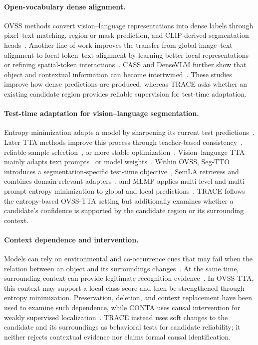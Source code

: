 \documentclass[letterpaper]{article}
\begin{document}
	\paragraph{Open-vocabulary dense alignment.}
	OVSS methods convert vision--language representations into dense labels through pixel--text matching, region or mask prediction, and CLIP-derived segmentation heads~\cite{ghiasi2022openseg,xu2022simple,zegformer2022,liang2023ovseg,ding2023maskclip,cho2024catseg}. Another line of work improves the transfer from global image--text alignment to local token--text alignment by learning better local representations or refining spatial-token interactions~\cite{mukhoti2023pacl,wu2024clipself,hajimiri2025naclip,shao2024cliptrase}. CASS and DenseVLM further show that object and contextual information can become intertwined~\cite{kim2025cass,li2025densevlm}. These studies improve how dense predictions are produced, whereas TRACE asks whether an existing candidate region provides reliable supervision for test-time adaptation.
	
	\paragraph{Test-time adaptation for vision--language segmentation.}
	Entropy minimization adapts a model by sharpening its current test predictions~\cite{grandvalet2004entropy,wang2021tent}. Later TTA methods improve this process through teacher-based consistency~\cite{wang2022cotta}, reliable sample selection~\cite{niu2022eata}, or more stable optimization~\cite{niu2023sar}. Vision--language TTA mainly adapts text prompts~\cite{shu2022tpt} or model weights~\cite{osowiechi2024watt}. Within OVSS, Seg-TTO introduces a segmentation-specific test-time objective~\cite{desilva2025segtto}, SemLA retrieves and combines domain-relevant adapters~\cite{qorbani2025semla}, and MLMP applies multi-level and multi-prompt entropy minimization to global and local predictions~\cite{noori2025mlmp}. TRACE follows the entropy-based OVSS-TTA setting but additionally examines whether a candidate's confidence is supported by the candidate region or its surrounding context.
	
	\paragraph{Context dependence and intervention.}
	Models can rely on environmental and co-occurrence cues that may fail when the relation between an object and its surroundings changes~\cite{geirhos2020shortcut,beery2018terra,singh2020dontjudge,zhang2020context}. At the same time, surrounding context can provide legitimate recognition evidence~\cite{xiao2021backgrounds}. In OVSS-TTA, this context may support a local class score and then be strengthened through entropy minimization. Preservation, deletion, and context replacement have been used to examine such dependence, while CONTA uses causal intervention for weakly supervised localization~\cite{fong2019extremal,zhang2020conta}. TRACE instead uses soft changes to the candidate and its surroundings as behavioral tests for candidate reliability; it neither rejects contextual evidence nor claims formal causal identification.
	
\end{document}
